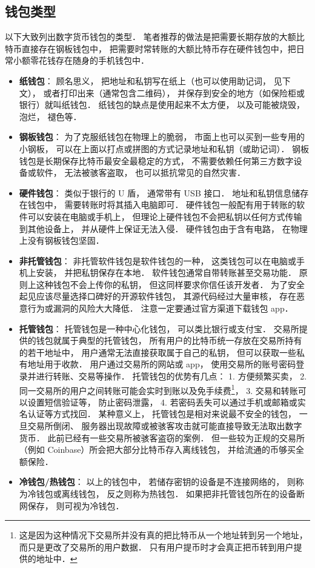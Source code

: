 \subsection{钱包类型}
以下大致列出数字货币钱包的类型． 笔者推荐的做法是把需要长期存放的大额比特币直接存在钢板钱包中， 把需要时常转账的大额比特币存在硬件钱包中，把日常小额零花钱存在随身的手机钱包中．
\begin{itemize}
\item \textbf{纸钱包}： 顾名思义， 把地址和私钥写在纸上（也可以使用助记词， 见下文）， 或者打印出来（通常包含二维码）， 并保存到安全的地方（如保险柜或银行）就叫纸钱包． 纸钱包的缺点是使用起来不太方便， 以及可能被烧毁， 泡烂， 褪色等．
\item \textbf{钢板钱包}： 为了克服纸钱包在物理上的脆弱， 市面上也可以买到一些专用的小钢板， 可以在上面以打点或拼图的方式记录地址和私钥（或助记词）． 钢板钱包是长期保存比特币最安全最稳定的方式， 不需要依赖任何第三方数字设备或软件， 无法被骇客盗取， 也可以抵抗常见的自然灾害．
\item \textbf{硬件钱包}： 类似于银行的 U 盾， 通常带有 USB 接口． 地址和私钥信息储存在钱包中， 需要转账时将其插入电脑即可． 硬件钱包一般配有用于转账的软件可以安装在电脑或手机上， 但理论上硬件钱包不会把私钥以任何方式传输到其他设备上， 并从硬件上保证无法入侵． 硬件钱包由于含有电路， 在物理上没有钢板钱包坚固．
\item \textbf{非托管钱包}： 非托管软件钱包是软件钱包的一种， 这类钱包可以在电脑或手机上安装， 并把私钥保存在本地． 软件钱包通常自带转账甚至交易功能． 原则上这种钱包不会上传你的私钥， 但这同样要求你信任该开发者． 为了安全起见应该尽量选择口碑好的开源软件钱包， 其源代码经过大量审核， 存在恶意行为或漏洞的风险大大降低． 注意一定要通过官方渠道下载钱包 app．
\item \textbf{托管钱包}： 托管钱包是一种中心化钱包， 可以类比银行或支付宝． 交易所提供的钱包就属于典型的托管钱包， 所有用户的比特币统一存放在交易所持有的若干地址中， 用户通常无法直接获取属于自己的私钥， 但可以获取一些私有地址用于收款． 用户通过交易所的网站或 app， 使用交易所的账号密码登录并进行转账、交易等操作． 托管钱包的优势有几点： 1. 方便频繁买卖， 2. 同一交易所的用户之间转账可能会实时到账以及免手续费\footnote{这是因为这种情况下交易所并没有真的把比特币从一个地址转到另一个地址， 而只是更改了交易所的用户数据． 只有用户提币时才会真正把币转到用户提供的地址中．}， 3. 交易和转账可以设置短信验证等， 防止密码泄露， 4. 若密码丢失可以通过手机或邮箱或实名认证等方式找回． 某种意义上， 托管钱包是相对来说最不安全的钱包， 一旦交易所倒闭、 服务器出现故障或被骇客攻击就可能直接导致无法取出数字货币． 此前已经有一些交易所被骇客盗窃的案例． 但一些较为正规的交易所（例如 Coinbase）所会把大部分比特币存入离线钱包， 并给流通的币够买全额保险．
\item \textbf{冷钱包/热钱包}： 以上的钱包中， 若储存密钥的设备是不连接网络的， 则称为冷钱包或离线钱包， 反之则称为热钱包． 如果把非托管钱包所在的设备断网保存， 则可视为冷钱包．
\end{itemize}

